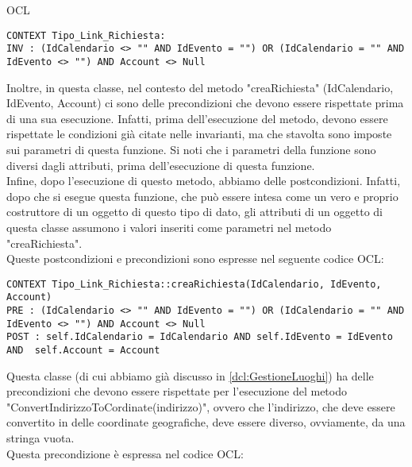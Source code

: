 \begin{listaPersonale}{OCL}
    \begin{lstlisting}
CONTEXT Tipo_Link_Richiesta:
INV : (IdCalendario <> "" AND IdEvento = "") OR (IdCalendario = "" AND IdEvento <> "") AND Account <> Null
    \end{lstlisting}
    Inoltre, in questa classe, nel contesto del metodo "creaRichiesta" (IdCalendario, IdEvento, Account) ci sono delle precondizioni che devono essere rispettate prima di una sua esecuzione. Infatti, prima dell'esecuzione del metodo, devono essere rispettate le condizioni già citate nelle invarianti, ma che stavolta sono imposte sui parametri di questa funzione. Si noti che i parametri della funzione sono diversi dagli attributi, prima dell'esecuzione di questa funzione.\\
    Infine, dopo l'esecuzione di questo metodo, abbiamo delle postcondizioni. Infatti, dopo che si esegue questa funzione, che può essere intesa come un vero e proprio costruttore di un oggetto di questo tipo di dato, gli attributi di un oggetto di questa classe assumono i valori inseriti come parametri nel metodo "creaRichiesta". \\
    Queste postcondizioni e precondizioni sono espresse nel seguente codice OCL:

    \begin{lstlisting}
CONTEXT Tipo_Link_Richiesta::creaRichiesta(IdCalendario, IdEvento, Account)
PRE : (IdCalendario <> "" AND IdEvento = "") OR (IdCalendario = "" AND IdEvento <> "") AND Account <> Null
POST : self.IdCalendario = IdCalendario AND self.IdEvento = IdEvento AND  self.Account = Account  
    \end{lstlisting}




    \begin{center}
        
    \end{center}
    Questa classe (di cui abbiamo già discusso in \ref{dcl:GestioneLuoghi}) ha delle precondizioni che devono essere rispettate per l'esecuzione del metodo "ConvertIndirizzoToCordinate(indirizzo)", ovvero che l'indirizzo, che deve essere convertito in delle coordinate geografiche, deve essere diverso, ovviamente, da una stringa vuota.\\
    Questa precondizione è espressa nel codice OCL:


\end{listaPersonale}
